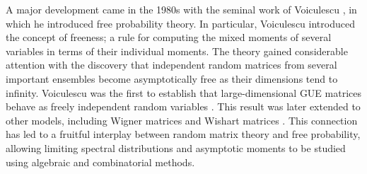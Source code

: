 \documentclass{article}
\theoremstyle{definition}
\newcommand{\Tr}{\text{Tr}}
\begin{document}
A major development came in the 1980s with the seminal work of Voiculescu \cite{V}, in which he introduced free probability theory. In particular, Voiculescu introduced the concept of freeness; a rule for computing the mixed moments of several variables in terms of their individual moments. The theory gained considerable attention with the discovery that independent random matrices from several important ensembles become asymptotically free as their dimensions tend to infinity. Voiculescu was the first to establish that large-dimensional GUE matrices behave as freely independent random variables \cite{V}. This result was later extended to other models, including Wigner matrices \cite{D} and Wishart matrices \cite{HP,CC}. This connection has led to a fruitful interplay between random matrix theory and free probability, allowing limiting spectral distributions and asymptotic moments to be studied using algebraic and combinatorial methods. 

\end{document}
